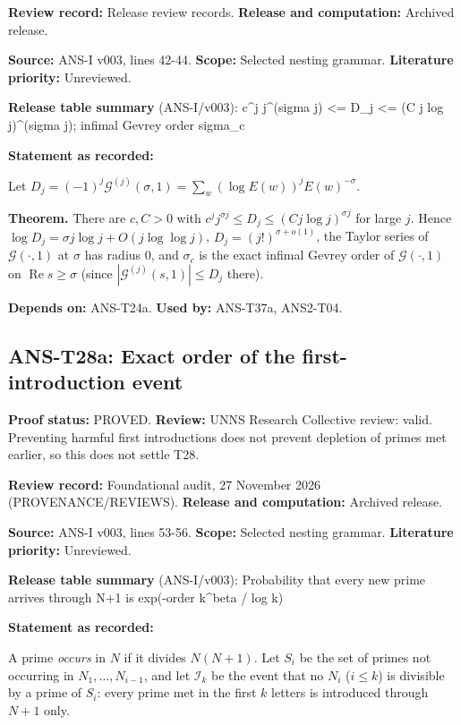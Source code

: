 \documentclass[
  11pt,
]{article}
\begin{document}
\textbf{Review record:} Release review records. \textbf{Release and
computation:} Archived release.

\textbf{Source:} ANS-I v003, lines 42-44. \textbf{Scope:} Selected
nesting grammar. \textbf{Literature priority:} Unreviewed.

\textbf{Release table summary} (ANS-I/v003): c\^{}j j\^{}(sigma j)
\textless= D\_j \textless= (C j log j)\^{}(sigma j); infimal Gevrey
order sigma\_c

\textbf{Statement as recorded:}

Let
\(D_j=(-1)^j\mathcal G^{(j)}(\sigma,1)=\sum_w(\log E(w))^jE(w)^{-\sigma}\).

\textbf{Theorem.} There are \(c,C>0\) with
\(c^j j^{\sigma j}\le D_j\le(Cj\log j)^{\sigma j}\) for large \(j\).
Hence \(\log D_j=\sigma j\log j+O(j\log\log j)\),
\(D_j=(j!)^{\sigma+o(1)}\), the Taylor series of \(\mathcal G(\cdot,1)\)
at \(\sigma\) has radius \(0\), and \(\sigma_c\) is the exact infimal
Gevrey order of \(\mathcal G(\cdot,1)\) on
\(\operatorname{Re}s\ge\sigma\) (since
\(|\mathcal G^{(j)}(s,1)|\le D_j\) there).

\textbf{Depends on:} ANS-T24a. \textbf{Used by:} ANS-T37a, ANS2-T04.

\hypertarget{ans-t28a-exact-order-of-the-first-introduction-event}{%
\subsection{ANS-T28a: Exact order of the first-introduction
event}\label{ans-t28a-exact-order-of-the-first-introduction-event}}

\textbf{Proof status:} PROVED. \textbf{Review:} UNNS Research Collective
review: valid. Preventing harmful first introductions does not prevent
depletion of primes met earlier, so this does not settle T28.

\textbf{Review record:} Foundational audit, 27 November 2026
(PROVENANCE/REVIEWS). \textbf{Release and computation:} Archived
release.

\textbf{Source:} ANS-I v003, lines 53-56. \textbf{Scope:} Selected
nesting grammar. \textbf{Literature priority:} Unreviewed.

\textbf{Release table summary} (ANS-I/v003): Probability that every new
prime arrives through N+1 is exp(-order k\^{}beta / log k)

\textbf{Statement as recorded:}

A prime \emph{occurs} in \(N\) if it divides \(N(N+1)\). Let \(S_i\) be
the set of primes not occurring in \(N_1,\dots,N_{i-1}\), and let
\(\mathcal I_k\) be the event that no \(N_i\) (\(i\le k\)) is divisible
by a prime of \(S_i\): every prime met in the first \(k\) letters is
introduced through \(N+1\) only.
\end{document}
